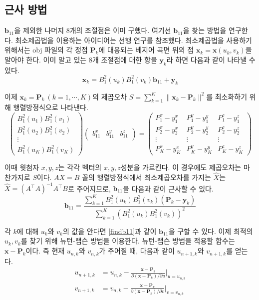 \documentclass[10pt]{gshs-report-v2.0}
\theoremstyle{theorem}
\theoremstyle{lemma}
\theoremstyle{definition}
\begin{document}
\subsection{근사 방법}
$\mathbf{b}_{11}$을 제외한 나머지 8개의 조절점은 이미 구했다. 여기선 $\mathbf{b}_{11}$을 찾는 방법을 연구한다. 최소제곱법을 이용하는 아이디어는 선행 연구를 참조했다.\cite{2021} 최소제곱법을 사용하기 위해서는 obj 파일의 각 정점 $\mathbf{P}_k$에 대응되는 베지어 곡면 위의 점 $\mathbf{x}_k=\mathbf{x}(u_k, v_k)$을 알아야 한다. 이미 알고 있는 8개 조절점에 대한 항을 $\mathbf{y}_k$라 하면 다음과 같이 나타낼 수 있다. 
\begin{equation*}
	\mathbf{x}_k=B_1^2(u_k)B_1^2(v_k)\mathbf{b}_{11}+\mathbf{y}_k
\end{equation*}

이제 $\mathbf{x}_k=\mathbf{P}_k\ (k=1, \cdots, K)$의 제곱오차 $S=\sum_{k=1}^K \| \mathbf{x}_k-\mathbf{P}_k \|^2$를 최소화하기 위해 행렬방정식으로 나타낸다.
\begin{equation*}
	\begin{pmatrix}
		B_1^2(u_1)B_1^2(v_1) \\ B_1^2(u_2)B_1^2(v_2) \\ \vdots \\ B_1^2(u_K)B_1^2(v_K)
	\end{pmatrix} \begin{pmatrix}
	b_{11}^x & b_{11}^y & b_{11}^z
	\end{pmatrix} = \begin{pmatrix}
	P_1^x-y_1^x & P_1^y-y_1^y & P_1^z-y_1^z \\ P_2^x-y_2^x & P_2^y-y_2^y & P_2^z-y_2^z \\ \vdots & \vdots & \vdots \\ P_K^x-y_K^x & P_K^y-y_K^y & P_K^z-y_K^z
	\end{pmatrix}
\end{equation*}

이때 윗첨자 $x, y, z$는 각각 벡터의 $x, y, z$성분을 가르킨다. 이 경우에도 제곱오차는 마찬가지로 $S$이다. $AX=B$ 꼴의 행렬방정식에서 최소제곱오차를 가지는 $\hat{X}$는 $\hat{X}=(A^\intercal A)^{-1}A^\intercal B$로 주어지므로, $\mathbf{b}_{11}$을 다음과 같이 근사할 수 있다. 
\begin{equation} \label{findb11}
	\mathbf{b}_{11}=\dfrac{\sum_{k=1}^K B_1^2(u_k)B_1^2(v_k)(\mathbf{P}_k-\mathbf{y}_k)}{\sum_{k=1}^K (B_1^2(u_k)B_1^2(v_k))^2}
\end{equation}

각 $k$에 대해 $u_k$와 $v_k$의 값을 안다면 \cref{findb11}과 같이 $\mathbf{b}_{11}$을 구할 수 있다. 이제 최적의 $u_k, v_k$를 찾기 위해 뉴턴-랩슨 방법을 이용한다. 뉴턴-랩슨 방법을 적용할 함수는 $\mathbf{x}-\mathbf{P}_k$이다. 즉 현재 $u_{n, k}$와 $v_{n, k}$가 주어질 때, 다음과 같이 $u_{n+1, k}$와 $v_{n+1, k}$를 얻는다. 
\begin{align} \label{rearrangeu}
	u_{n+1, k}&=u_{n, k}-\frac{\mathbf{x}-\mathbf{P}_k}{\partial(\mathbf{x}-\mathbf{P}_k)/\partial u} \bigg|_{u=u_{n, k}} \\
	v_{n+1, k}&=v_{n, k}-\frac{\mathbf{x}-\mathbf{P}_k}{\partial(\mathbf{x}-\mathbf{P}_k)/\partial v} \bigg|_{v=v_{n, k}} \label{rearrangev}
\end{align}
\end{document}
